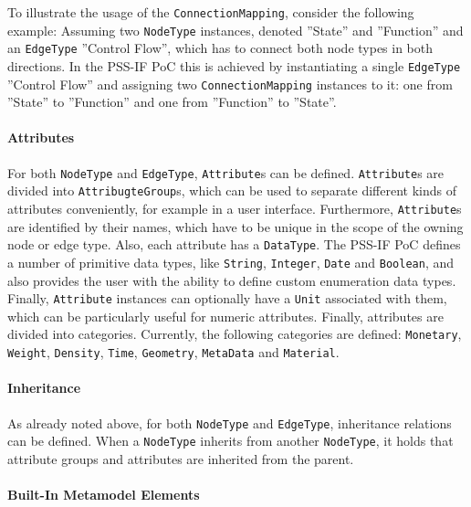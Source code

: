 To illustrate the usage of the \texttt{ConnectionMapping}, consider the following example: Assuming two \texttt{NodeType} instances, denoted ''State'' and ''Function'' and an \texttt{EdgeType} ''Control Flow'', which has to connect both node types in both directions. In the PSS-IF PoC this is achieved by instantiating a single \texttt{EdgeType} ''Control Flow'' and assigning two \texttt{ConnectionMapping} instances to it: one from ''State'' to ''Function'' and one from ''Function'' to ''State''.

\paragraph{Attributes}

For both \texttt{NodeType} and \texttt{EdgeType}, \texttt{Attribute}s can be defined. \texttt{Attribute}s are divided into \texttt{AttribugteGroup}s, which can be used to separate different kinds of attributes conveniently, for example in a user interface. Furthermore, \texttt{Attribute}s are identified by their names, which have to be unique in the scope of the owning node or edge type. Also, each attribute has a \texttt{DataType}. The PSS-IF PoC defines a number of primitive data types, like \texttt{String}, \texttt{Integer}, \texttt{Date} and \texttt{Boolean}, and also provides the user with the ability to define custom enumeration data types. Finally, \texttt{Attribute} instances can optionally have a \texttt{Unit} associated with them, which can be particularly useful for numeric attributes. Finally, attributes are divided into categories. Currently, the following categories are defined: \texttt{Monetary}, \texttt{Weight}, \texttt{Density}, \texttt{Time}, \texttt{Geometry}, \texttt{MetaData} and \texttt{Material}.

\paragraph{Inheritance}

As already noted above, for both \texttt{NodeType} and \texttt{EdgeType}, inheritance relations can be defined. When a \texttt{NodeType} inherits from another \texttt{NodeType}, it holds that attribute groups and attributes are inherited from the parent.

\paragraph{Built-In Metamodel Elements}

